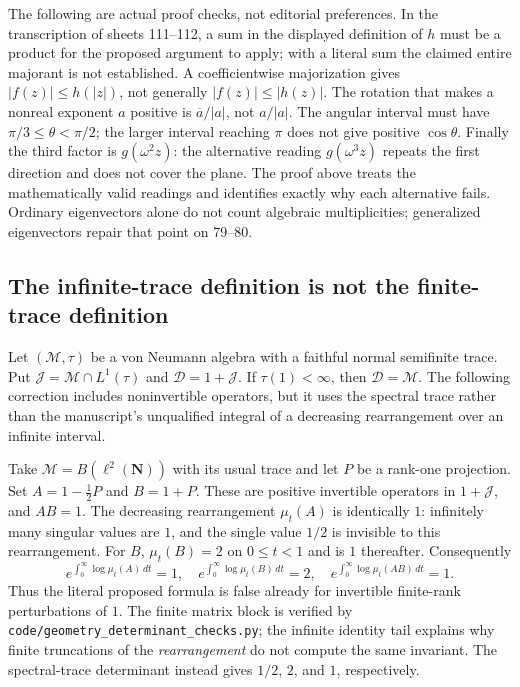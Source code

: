 The following are actual proof checks, not editorial preferences. In the
transcription of sheets 111--112, a sum in the displayed definition of $h$
must be a product for the proposed argument to apply; with a literal sum the
claimed entire majorant is not established. A coefficientwise majorization
gives $|f(z)|\leq h(|z|)$, not generally $|f(z)|\leq|h(z)|$. The rotation
that makes a nonreal exponent $a$ positive is $\overline a/|a|$, not
$a/|a|$. The angular interval must have $\pi/3\leq\theta<\pi/2$; the
larger interval reaching $\pi$ does not give positive $\cos\theta$.
Finally the third factor is $g(\omega^2z)$: the alternative reading
$g(\omega^3z)$ repeats the first direction and does not cover the plane.
The proof above treats the mathematically valid readings and identifies
exactly why each alternative fails. Ordinary eigenvectors alone do not count
algebraic multiplicities; generalized eigenvectors repair that point on
79--80.

\subsection{The infinite-trace definition is not the finite-trace definition}
Let $(\mathcal M,\tau)$ be a von Neumann algebra with a faithful normal
semifinite trace. Put $\mathcal J=\mathcal M\cap L^1(\tau)$ and
$\mathcal D=1+\mathcal J$. If $\tau(1)<\infty$, then
$\mathcal D=\mathcal M$. The following correction includes noninvertible
operators, but it uses the spectral trace rather than the manuscript's
unqualified integral of a decreasing rearrangement over an infinite interval.

\begin{example}
\label{geo-H-rearrangement}
Take $\mathcal M=B(\ell^2(\mathbf N))$ with its usual trace and let $P$ be
a rank-one projection. Set $A=1-\tfrac12P$ and $B=1+P$. These are positive
invertible operators in $1+\mathcal J$, and $AB=1$. The decreasing
rearrangement $\mu_t(A)$ is identically $1$: infinitely many singular values
are $1$, and the single value $1/2$ is invisible to this rearrangement.
For $B$, $\mu_t(B)=2$ on $0\leq t<1$ and is $1$ thereafter. Consequently
\[
 e^{\int_0^\infty\log\mu_t(A)\,dt}=1,\quad
 e^{\int_0^\infty\log\mu_t(B)\,dt}=2,\quad
 e^{\int_0^\infty\log\mu_t(AB)\,dt}=1.
\]
Thus the literal proposed formula is false already for invertible
finite-rank perturbations of $1$. The finite matrix block is verified by
\texttt{code/geometry\_determinant\_checks.py}; the infinite identity tail
explains why finite truncations of the \emph{rearrangement} do not compute the
same invariant. The spectral-trace determinant instead gives $1/2$, $2$,
and $1$, respectively.
\end{example}

